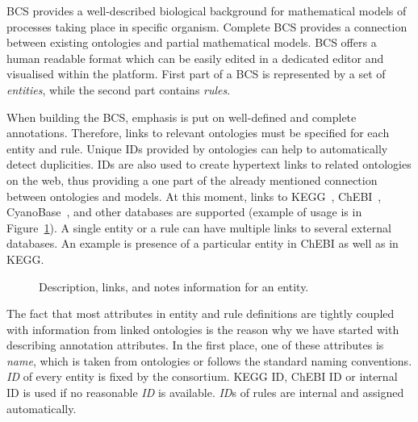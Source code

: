 \documentclass[12pt]{fithesis2}
\begin{document}
BCS provides a well-described biological background for mathematical models of processes taking place in specific organism. Complete BCS provides a connection between existing ontologies and partial mathematical models. BCS offers a human readable format which can be easily edited in a dedicated editor and visualised within the platform. First part of a BCS is represented by a set of \emph{entities}, while the second part contains \emph{rules}.

When building the BCS, emphasis is put on well-defined and complete annotations. Therefore, links to relevant ontologies must be specified for each entity and rule. Unique IDs provided by ontologies can help to automatically detect duplicities. IDs are also used to create hypertext links to related ontologies on the web, thus providing a one part of the already mentioned connection between ontologies and models. At this moment, links to KEGG~\cite{Kanehisa04012016}, ChEBI~\cite{ChEBI}, CyanoBase~\cite{CyanoBase}, and other databases are supported (example of usage is in Figure~\ref{database_links}). A single entity or a rule can have multiple links to several external databases. An example is presence of a particular entity in ChEBI as well as in KEGG.

\begin{figure}[!h]
\begin{center}
\end{center}
\caption{Description, links, and notes information for an entity.}\label{database_links}
\end{figure}

The fact that most attributes in entity and rule definitions are tightly coupled with information from linked ontologies is the reason why we have started with describing annotation attributes. In the first place, one of these attributes is \emph{name}, which is taken from ontologies or follows the standard naming conventions. \emph{ID} of every entity is fixed by the consortium. KEGG ID, ChEBI ID or internal ID is used if no reasonable \emph{ID} is available. \emph{ID}s of rules are internal and assigned automatically.
\end{document}
